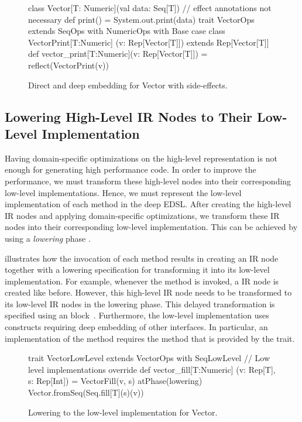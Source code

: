 \begin{figure}
\begin{listingtiny}
class Vector[T: Numeric](val data: Seq[T]) {
  // effect annotations not necessary
  def print() = System.out.print(data)
}
trait VectorOps extends SeqOps with
  NumericOps with Base {
  case class VectorPrint[T:Numeric]
    (v: Rep[Vector[T]]) extends Rep[Vector[T]]
  def vector_print[T:Numeric](v: Rep[Vector[T]]) =
    reflect(VectorPrint(v))
}
\end{listingtiny}
\caption{\label{lst:vector_deep_fx} Direct and deep embedding for Vector with side-effects.}
\end{figure}

\subsection{Lowering High-Level IR Nodes to Their Low-Level Implementation}
\label{sec:yy-impl-lower}

Having domain-specific optimizations on the high-level representation is not
enough for generating high performance code. In order to improve the
performance, we must transform these high-level nodes into their corresponding
low-level implementations. Hence, we must represent the low-level
implementation of each method in the deep EDSL. After creating the high-level
IR nodes and applying domain-specific optimizations, we transform these IR
nodes into their corresponding low-level implementation. This can be achieved by
using a \emph{lowering} phase \cite{rompf_optimizing_2013}.

 illustrates how the invocation of each method
results in creating an IR node together with a lowering specification for
transforming it into its low-level implementation. For example, whenever the
method  is invoked, a  IR node is created like
before. However, this high-level IR node needs to be transformed to its low-level
IR nodes in the lowering phase. This delayed transformation is specified
using an  block~\cite{rompf_optimizing_2013}.
Furthermore, the low-level implementation uses constructs requiring deep
embedding of other interfaces. In particular, an implementation of the
 method requires the  method that is provided by
the  trait.
\begin{figure}[ht]
\begin{listingtiny}
trait VectorLowLevel extends VectorOps
  with SeqLowLevel {
  // Low level implementations
  override def vector_fill[T:Numeric]
    (v: Rep[T], s: Rep[Int]) =
    VectorFill(v, s) atPhase(lowering) {
      Vector.fromSeq(Seq.fill[T](s)(v))
    }
}
\end{listingtiny}
\caption{\label{lst:vector_deep_low} Lowering to the low-level implementation for Vector.}
\end{figure}

